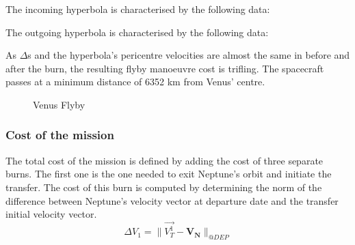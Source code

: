 \documentclass[11pt,a4paper]{report}
\renewcommand{\vec}[1]{\mathbf{#1}}
\begin{document}
The incoming hyperbola is characterised by the following data:

\begin{table}[H]
\centering
{}
\end{table}

The outgoing hyperbola is characterised by the following data:

\begin{table}[H]
\centering
{}
\end{table}

As \textbf{$\Delta$}s and the hyperbola's pericentre velocities are almost the same in before and after the burn, the resulting flyby manoeuvre cost is trifling.
The spacecraft passes at a minimum distance of 6352 km from Venus’ centre.

\begin{figure}[H]
\centering
{}
    \caption{Venus Flyby}
\end{figure}

\subsubsection{Cost of the mission}

The total cost of the mission is defined by adding the cost of three separate burns. 
The first one is the one needed to exit Neptune’s orbit and initiate the transfer. The cost of this burn is computed by determining the norm of the difference between Neptune’s velocity vector at departure date and the transfer initial velocity vector.
\begin{equation*}
    \Delta V_1 = \parallel\Vec{V_T^1} - \vec{V_N}\parallel_{@DEP}
\end{equation*}
\end{document}
